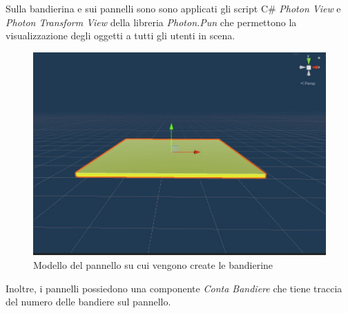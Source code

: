\hspace{-0.6cm}Sulla bandierina e sui pannelli sono sono applicati gli script C\# \textit{Photon View} e \textit{Photon Transform View} della libreria \textit{Photon.Pun} che permettono la visualizzazione degli oggetti a tutti gli utenti in scena.
\begin{figure}[H]
    \centering
    \includegraphics[scale = 0.4]{Immagini/pannello.jpg}
    \caption{Modello del pannello su cui vengono create le bandierine}
    \label{fig:my_label}
\end{figure}
\hspace{-0.6cm}Inoltre, i pannelli possiedono una componente \textit{Conta Bandiere} che tiene traccia del numero delle bandiere sul pannello.
